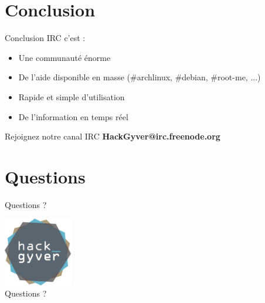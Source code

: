\documentclass{beamer}
\begin{document}
\section{Conclusion}
\begin{frame}{Conclusion}
IRC c'est :
\begin{itemize}
	\itemsep1.3em
		\item Une communauté énorme
		\item De l'aide disponible en masse (\#archlinux, \#debian, \#root-me, ...)
		\item Rapide et simple d'utilisation
		\item De l'information en temps réel
\end{itemize}
\begin{center}
	\Large{Rejoignez notre canal IRC \textbf{HackGyver@irc.freenode.org}}
\end{center}
\end{frame}

\section{Questions}
\begin{frame}{Questions ?}
\begin{center}
	\includegraphics[height=3cm,width=3cm]{images/LogoHackGyver.png} \\
	\Huge{Questions ?}
\end{center}
\end{frame}
\end{document}
